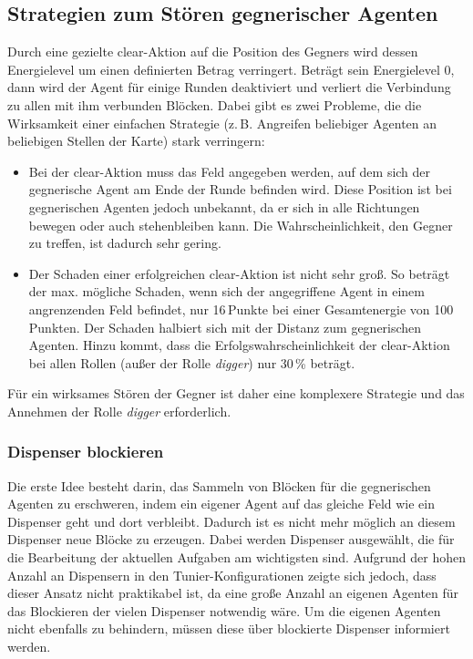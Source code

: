 \documentclass[runningheads]{llncs}
\begin{document}
\subsection{Strategien zum Stören gegnerischer Agenten}
Durch eine gezielte clear-Aktion auf die Position des Gegners wird dessen Energielevel um einen definierten Betrag verringert. Beträgt sein Energielevel 0, dann wird der Agent für einige Runden deaktiviert und verliert die Verbindung zu allen mit ihm verbunden Blöcken. Dabei gibt es zwei Probleme, die die Wirksamkeit einer einfachen Strategie (z.\,B. Angreifen beliebiger Agenten an beliebigen Stellen der Karte) stark verringern:
\begin{itemize}
\item{Bei der clear-Aktion muss das Feld angegeben werden, auf dem sich der gegnerische Agent am Ende der Runde befinden wird. Diese Position ist bei gegnerischen Agenten jedoch unbekannt, da er sich in alle Richtungen bewegen oder auch stehenbleiben kann. Die Wahrscheinlichkeit, den Gegner zu treffen, ist dadurch sehr gering.}
\item{Der Schaden einer erfolgreichen clear-Aktion ist nicht sehr groß. So beträgt der max. mögliche Schaden, wenn sich der angegriffene Agent in einem angrenzenden Feld befindet, nur 16\,Punkte bei einer Gesamtenergie von 100\,Punkten. Der Schaden halbiert sich mit der Distanz zum gegnerischen Agenten. Hinzu kommt, dass die Erfolgswahrscheinlichkeit der clear-Aktion bei allen Rollen (außer der Rolle \textit{digger}) nur 30\,\% beträgt.}
\end{itemize}
Für ein wirksames Stören der Gegner ist daher eine komplexere Strategie und das Annehmen der Rolle \textit{digger} erforderlich.
\subsubsection{Dispenser blockieren}
Die erste Idee besteht darin, das Sammeln von Blöcken für die gegnerischen Agenten zu erschweren, indem ein eigener Agent auf das gleiche Feld wie ein Dispenser geht und dort verbleibt. Dadurch ist es nicht mehr möglich an diesem Dispenser neue Blöcke zu erzeugen. Dabei werden Dispenser ausgewählt, die für die Bearbeitung der aktuellen Aufgaben am wichtigsten sind. Aufgrund der hohen Anzahl an Dispensern in den Tunier-Konfigurationen zeigte sich jedoch, dass dieser Ansatz nicht praktikabel ist, da eine große Anzahl an eigenen Agenten für das Blockieren der vielen Dispenser notwendig wäre. Um die eigenen Agenten nicht ebenfalls zu behindern, müssen diese über blockierte Dispenser informiert werden.
\end{document}
